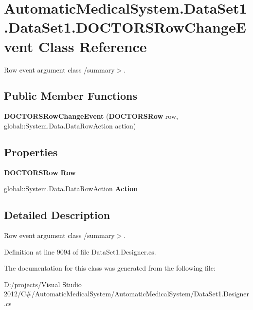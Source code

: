 \section{AutomaticMedicalSystem.DataSet1.DataSet1.DOCTORSRowChangeEvent Class Reference}
\label{class_automatic_medical_system_1_1_data_set1_1_1_d_o_c_t_o_r_s_row_change_event}
Row event argument class /summary$>$.  


\subsection*{Public Member Functions}
\begin{CompactItemize}
\item 
\textbf{DOCTORSRowChangeEvent} ({\bf DOCTORSRow} row, global::System.Data.DataRowAction action)\label{class_automatic_medical_system_1_1_data_set1_1_1_d_o_c_t_o_r_s_row_change_event_293172cd7b07dfc97a11654b23a63b88}

\end{CompactItemize}
\subsection*{Properties}
\begin{CompactItemize}
\item 
{\bf DOCTORSRow} \textbf{Row}\hspace{0.3cm}{\tt  [get]}\label{class_automatic_medical_system_1_1_data_set1_1_1_d_o_c_t_o_r_s_row_change_event_0940c9dd7d5f7d8b87bf29e38bddb40b}

\item 
global::System.Data.DataRowAction \textbf{Action}\hspace{0.3cm}{\tt  [get]}\label{class_automatic_medical_system_1_1_data_set1_1_1_d_o_c_t_o_r_s_row_change_event_32386141b9b88b7030771dc3b2cfbc88}

\end{CompactItemize}


\subsection{Detailed Description}
Row event argument class /summary$>$. 

Definition at line 9094 of file DataSet1.Designer.cs.

The documentation for this class was generated from the following file:\begin{CompactItemize}
\item 
D:/projects/Visual Studio 2012/C\#/AutomaticMedicalSystem/AutomaticMedicalSystem/DataSet1.Designer.cs\end{CompactItemize}
